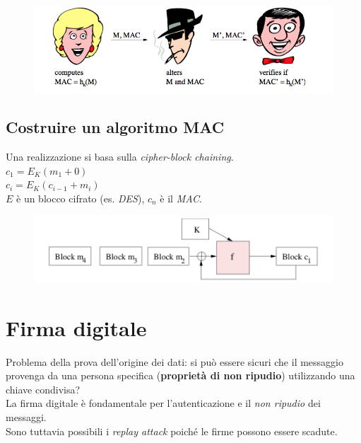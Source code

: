 \documentclass[11pt, a4paper, twoside, italian]{report}
\theoremstyle{plain}
\begin{document}
\begin{figure}[H]
	\centering
	\includegraphics[scale=0.52]{macscheme.png}
\end{figure}

\subsection*{Costruire un algoritmo MAC}
\begin{multicols}{2}
\noindent
Una realizzazione si basa sulla \textit{cipher-block chaining}.\\
$c_1 = E_K (m_1 + 0)$\\
$c_i = E_K (c_{i-1} + m_i)$\\
$E$ è un blocco cifrato (es. \textit{DES}), $c_n$ è il \textit{MAC}.
\columnbreak
\begin{figure}[H]
	\centering
	\includegraphics[scale=0.55]{maccostruction.png}
\end{figure}
\end{multicols}

\section*{Firma digitale}
Problema della prova dell'origine dei dati: si può essere sicuri che il messaggio provenga da una persona specifica (\textbf{proprietà di non ripudio}) utilizzando una chiave condivisa?\\
La firma digitale è fondamentale per l'autenticazione e il \textit{non ripudio} dei messaggi.\\
Sono tuttavia possibili i \textit{replay attack} poiché le firme possono essere scadute.
\end{document}

